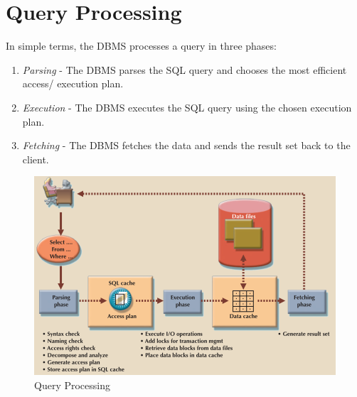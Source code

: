 \documentclass[a4paper, 11pt, titlepage]{report}
\begin{document}
\section{Query Processing}
In simple terms, the DBMS processes a query in three phases:
\begin{enumerate}
\item \textit{Parsing} - The DBMS parses the SQL query and chooses the most efficient access/
execution plan.
\item \textit{Execution} - The DBMS executes the SQL query using the chosen execution plan.
\item \textit{Fetching} - The DBMS fetches the data and sends the result set back to the client.
\end{enumerate}
\begin{figure}[H]
\centering
\includegraphics[scale=0.5]{pics/query}
\caption{Query Processing}
\end{figure}
\end{document}
